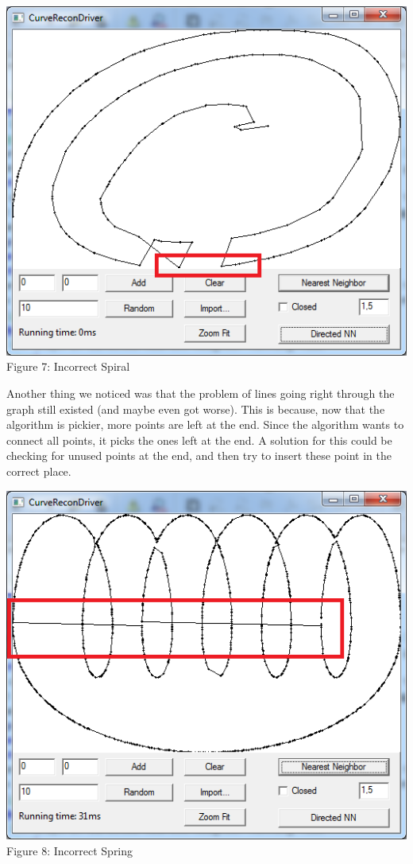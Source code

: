         \begin{center}
          \includegraphics[scale = 0.6]{2DirectedNearestNeighbor/dnnSpiralgraph.png}\\
          Figure 7: Incorrect Spiral
        \end{center}

        \noindent Another thing we noticed was that the problem of lines going right through the graph still existed (and maybe even got worse). This is because, now that the algorithm is pickier, more points are left at the end. Since the algorithm wants to connect all points, it picks the ones left at the end.
        A solution for this could be checking for unused points at the end, and then try to insert these point in the correct place.\\

        \begin{center}
          \includegraphics[scale = 0.6]{2DirectedNearestNeighbor/dnnSpringgraph.png}\\
          Figure 8: Incorrect Spring
        \end{center}

